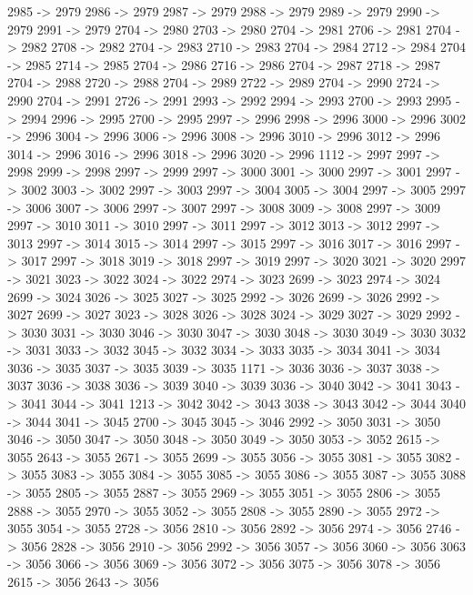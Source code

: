 {	2985 -> 2979
	2986 -> 2979
	2987 -> 2979
	2988 -> 2979
	2989 -> 2979
	2990 -> 2979
	2991 -> 2979
	2704 -> 2980
	2703 -> 2980
	2704 -> 2981
	2706 -> 2981
	2704 -> 2982
	2708 -> 2982
	2704 -> 2983
	2710 -> 2983
	2704 -> 2984
	2712 -> 2984
	2704 -> 2985
	2714 -> 2985
	2704 -> 2986
	2716 -> 2986
	2704 -> 2987
	2718 -> 2987
	2704 -> 2988
	2720 -> 2988
	2704 -> 2989
	2722 -> 2989
	2704 -> 2990
	2724 -> 2990
	2704 -> 2991
	2726 -> 2991
	2993 -> 2992
	2994 -> 2993
	2700 -> 2993
	2995 -> 2994
	2996 -> 2995
	2700 -> 2995
	2997 -> 2996
	2998 -> 2996
	3000 -> 2996
	3002 -> 2996
	3004 -> 2996
	3006 -> 2996
	3008 -> 2996
	3010 -> 2996
	3012 -> 2996
	3014 -> 2996
	3016 -> 2996
	3018 -> 2996
	3020 -> 2996
	1112 -> 2997
	2997 -> 2998
	2999 -> 2998
	2997 -> 2999
	2997 -> 3000
	3001 -> 3000
	2997 -> 3001
	2997 -> 3002
	3003 -> 3002
	2997 -> 3003
	2997 -> 3004
	3005 -> 3004
	2997 -> 3005
	2997 -> 3006
	3007 -> 3006
	2997 -> 3007
	2997 -> 3008
	3009 -> 3008
	2997 -> 3009
	2997 -> 3010
	3011 -> 3010
	2997 -> 3011
	2997 -> 3012
	3013 -> 3012
	2997 -> 3013
	2997 -> 3014
	3015 -> 3014
	2997 -> 3015
	2997 -> 3016
	3017 -> 3016
	2997 -> 3017
	2997 -> 3018
	3019 -> 3018
	2997 -> 3019
	2997 -> 3020
	3021 -> 3020
	2997 -> 3021
	3023 -> 3022
	3024 -> 3022
	2974 -> 3023
	2699 -> 3023
	2974 -> 3024
	2699 -> 3024
	3026 -> 3025
	3027 -> 3025
	2992 -> 3026
	2699 -> 3026
	2992 -> 3027
	2699 -> 3027
	3023 -> 3028
	3026 -> 3028
	3024 -> 3029
	3027 -> 3029
	2992 -> 3030
	3031 -> 3030
	3046 -> 3030
	3047 -> 3030
	3048 -> 3030
	3049 -> 3030
	3032 -> 3031
	3033 -> 3032
	3045 -> 3032
	3034 -> 3033
	3035 -> 3034
	3041 -> 3034
	3036 -> 3035
	3037 -> 3035
	3039 -> 3035
	1171 -> 3036
	3036 -> 3037
	3038 -> 3037
	3036 -> 3038
	3036 -> 3039
	3040 -> 3039
	3036 -> 3040
	3042 -> 3041
	3043 -> 3041
	3044 -> 3041
	1213 -> 3042
	3042 -> 3043
	3038 -> 3043
	3042 -> 3044
	3040 -> 3044
	3041 -> 3045
	2700 -> 3045
	3045 -> 3046
	2992 -> 3050
	3031 -> 3050
	3046 -> 3050
	3047 -> 3050
	3048 -> 3050
	3049 -> 3050
	3053 -> 3052
	2615 -> 3055
	2643 -> 3055
	2671 -> 3055
	2699 -> 3055
	3056 -> 3055
	3081 -> 3055
	3082 -> 3055
	3083 -> 3055
	3084 -> 3055
	3085 -> 3055
	3086 -> 3055
	3087 -> 3055
	3088 -> 3055
	2805 -> 3055
	2887 -> 3055
	2969 -> 3055
	3051 -> 3055
	2806 -> 3055
	2888 -> 3055
	2970 -> 3055
	3052 -> 3055
	2808 -> 3055
	2890 -> 3055
	2972 -> 3055
	3054 -> 3055
	2728 -> 3056
	2810 -> 3056
	2892 -> 3056
	2974 -> 3056
	2746 -> 3056
	2828 -> 3056
	2910 -> 3056
	2992 -> 3056
	3057 -> 3056
	3060 -> 3056
	3063 -> 3056
	3066 -> 3056
	3069 -> 3056
	3072 -> 3056
	3075 -> 3056
	3078 -> 3056
	2615 -> 3056
	2643 -> 3056
}
